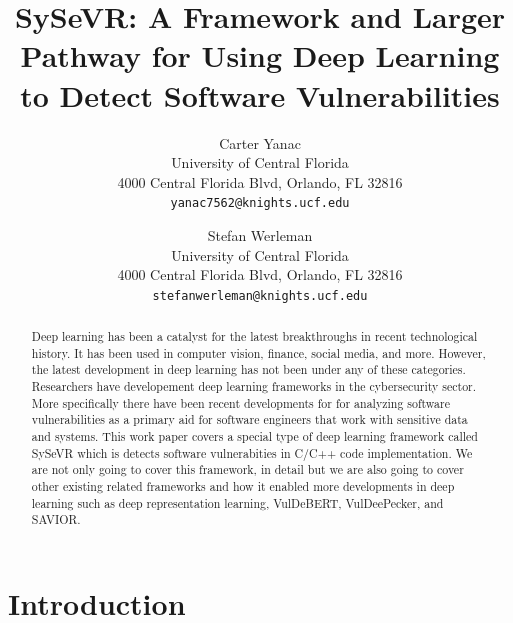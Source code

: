 \documentclass[12pt,twocolumn,letterpaper]{article}
\begin{document}
\title{SySeVR: A Framework and Larger Pathway for Using Deep Learning to Detect Software Vulnerabilities}


\author{
    Carter Yanac\\
    University of Central Florida\\
    4000 Central Florida Blvd, Orlando, FL 32816\\
    {\tt\small yanac7562@knights.ucf.edu}
    \and
    Stefan Werleman\\
    University of Central Florida\\
    4000 Central Florida Blvd, Orlando, FL 32816\\
    {\tt\small stefanwerleman@knights.ucf.edu}
}
\maketitle

\begin{abstract}
    Deep learning has been a catalyst for the latest breakthroughs in recent technological history. It has been 
    used in computer vision, finance, social media, and more. However, the latest development in deep 
    learning has not been under any of these categories. Researchers have developement deep learning 
    frameworks in the cybersecurity sector. More specifically there have been recent developments for 
    for analyzing software vulnerabilities as a primary aid for software engineers that work with sensitive 
    data and systems. This work paper covers a special type of deep learning framework called SySeVR which is 
    detects software vulnerabities in C/C++ code implementation. We are not only going to cover this framework, 
    in detail but we are also going to cover other existing related frameworks and how it enabled more 
    developments in deep learning such as deep representation learning, VulDeBERT, VulDeePecker, and SAVIOR.
\end{abstract}

\section{Introduction}
\label{sec:intro}
\end{document}
